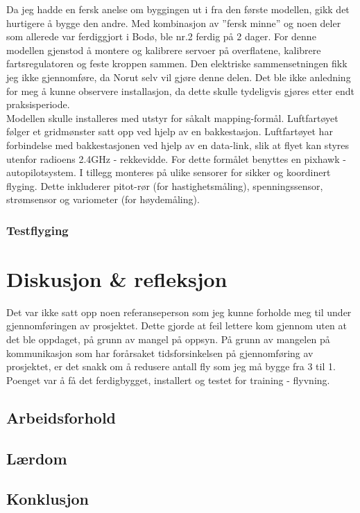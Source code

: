 \documentclass[12pt, a4paper]{report}
\begin{document}
Da jeg hadde en fersk anelse om byggingen ut i fra den første modellen, gikk det hurtigere å bygge den andre. Med kombinasjon av ''fersk minne'' og noen deler som allerede var ferdiggjort i Bodø, ble nr.2 ferdig på 2 dager. For denne modellen gjenstod å montere og kalibrere servoer på overflatene, kalibrere fartsregulatoren og feste kroppen sammen. Den elektriske sammensetningen fikk jeg ikke gjennomføre, da Norut selv vil gjøre denne delen. Det ble ikke anledning for meg å kunne observere installasjon, da dette skulle tydeligvis gjøres etter endt praksisperiode. \\
Modellen skulle installeres med utstyr for såkalt mapping-formål. Luftfartøyet følger et gridmønster satt opp ved hjelp av en bakkestasjon. Luftfartøyet har forbindelse med bakkestasjonen ved hjelp av en data-link, slik at flyet kan styres utenfor radioens 2.4GHz - rekkevidde. For dette formålet benyttes en pixhawk - autopilotsystem. I tillegg monteres på ulike sensorer for sikker og koordinert flyging. Dette inkluderer pitot-rør (for hastighetsmåling), spenningssensor, strømsensor og variometer (for høydemåling). 

\subsubsection{Testflyging}


\newpage
\section{Diskusjon \& refleksjon}
Det var ikke satt opp noen referanseperson som jeg kunne forholde meg til under gjennomføringen av prosjektet. Dette gjorde at feil lettere kom gjennom uten at det ble oppdaget, på grunn av mangel på oppsyn. På grunn av mangelen på kommunikasjon som har forårsaket tidsforsinkelsen på gjennomføring av prosjektet, er det snakk om å redusere antall fly som jeg må bygge fra 3 til 1. Poenget var å få det ferdigbygget, installert og testet for training - flyvning. 

\subsection{Arbeidsforhold}
\subsection{Lærdom}


\subsection{Konklusjon}
\end{document}
